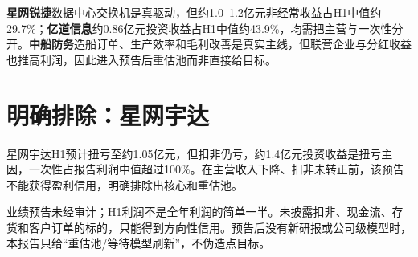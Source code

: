 \textbf{星网锐捷}数据中心交换机是真驱动，但约1.0--1.2亿元非经常收益占H1中值约29.7\%；\textbf{亿道信息}约0.86亿元投资收益占H1中值约43.9\%，均需把主营与一次性分开。\textbf{中船防务}造船订单、生产效率和毛利改善是真实主线，但联营企业与分红收益也推高利润，因此进入预告后重估池而非直接给目标。

\section{明确排除：星网宇达}

星网宇达H1预计扭亏至约1.05亿元，但扣非仍亏，约1.4亿元投资收益是扭亏主因，一次性占报告利润中值超过100\%。在主营收入下降、扣非未转正前，该预告不能获得盈利信用，明确排除出核心和重估池。

\begin{riskbox}[预告使用边界]
业绩预告未经审计；H1利润不是全年利润的简单一半。未披露扣非、现金流、存货和客户订单的标的，只能得到方向性信用。预告后没有新研报或公司级模型时，本报告只给“重估池/等待模型刷新”，不伪造点目标。
\end{riskbox}
